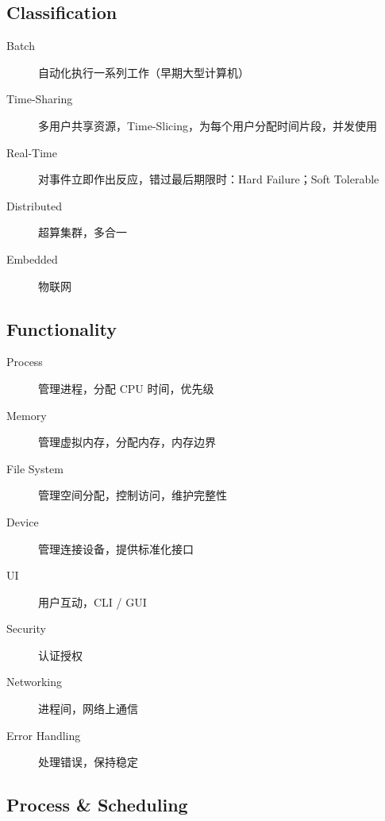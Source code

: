 \documentclass[11pt,journal,compsoc]{IEEEtran}
\begin{document}
\subsection{Classification}

\begin{description}
    \item[Batch] 自动化执行一系列工作（早期大型计算机）

    \item[Time-Sharing] 多用户共享资源，Time-Slicing，为每个用户分配时间片段，并发使用

    \item[Real-Time] 对事件立即作出反应，错过最后期限时：Hard Failure；Soft Tolerable

    \item[Distributed] 超算集群，多合一

    \item[Embedded] 物联网
\end{description}


\subsection{Functionality}

\begin{description}
    \item[Process] 管理进程，分配 CPU 时间，优先级

    \item[Memory] 管理虚拟内存，分配内存，内存边界

    \item[File System] 管理空间分配，控制访问，维护完整性

    \item[Device] 管理连接设备，提供标准化接口

    \item[UI] 用户互动，CLI / GUI

    \item[Security] 认证授权

    \item[Networking] 进程间，网络上通信

    \item[Error Handling] 处理错误，保持稳定
\end{description}


\subsection{Process \& Scheduling}
\end{document}
